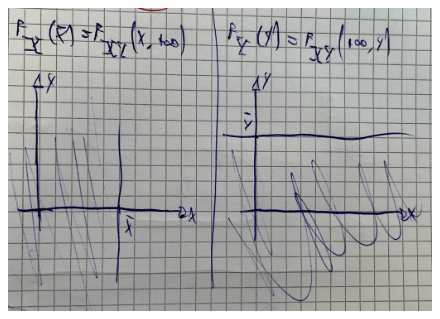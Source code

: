 \documentclass{article}
\begin{document}
\begin{figure}[ht]
\centering
\includegraphics[scale=0.12]{images/77.CDF_Marg_Cont.jpeg}
\end{figure} 
\end{document}
